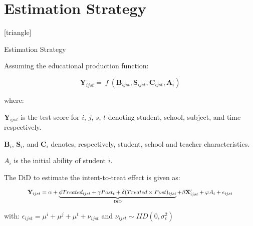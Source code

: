 \documentclass{beamer}
\begin{document}
\section{Estimation Strategy}
[triangle]

\begin{frame}{Estimation Strategy}

\begin{itemize} 
{\footnotesize\item Assuming the educational production function:}
\vspace{-5pt}

\begin{equation} \label{eq:ProdFunction}
\mathbf{Y}_{ijst} = \:f\:(\mathbf{B}_{ijst}, \mathbf{S}_{ijst}, \mathbf{C}_{ijst}, \mathbf{A}_{i})
\end{equation}

{\scriptsize where:}
\begin{itemize}
{\tiny\item $\mathbf{Y}_{ijst}$ is the test score for $i$, $j$, $s$, $t$ denoting student, school, subject, and time respectively.}
{\tiny\item $\mathbf{B}_i$, $\mathbf{S}_i$, and $\mathbf{C}_i$ denotes, respectively, student, school and teacher characteristics.}
\vspace{-5pt}
{\tiny\item $A_{i}$ is the initial ability of student $i$.}
\end{itemize}


\vspace{5pt}
{\footnotesize\item The DiD to estimate the intent-to-treat effect is given as:}
\vspace{-15pt}

\begin{equation} \label{eq:DiD-Treat}
\resizebox{.85\hsize}{!}{$\mathbf{Y}_{ijst} = \alpha + \underbrace{\phi Treated_{ijst} + \gamma Post_{t} + \delta (Treated \times Post)_{ijst}}_{\text{DiD}}+ \beta\mathbf{X}_{ijst}^{\prime} + \varphi A_{i} + \epsilon_{ijst}$} 
\end{equation}


{\scriptsize with: \hspace{50pt} $\epsilon_{ijst} = \mu^i + \mu^j + \mu^t +  \nu_{ijst}$ \hspace{30pt} and \hspace{20pt} $\nu_{ijst} \sim IID(0, \sigma^2_{\epsilon})$}





\end{itemize}
\end{frame}
\end{document}
